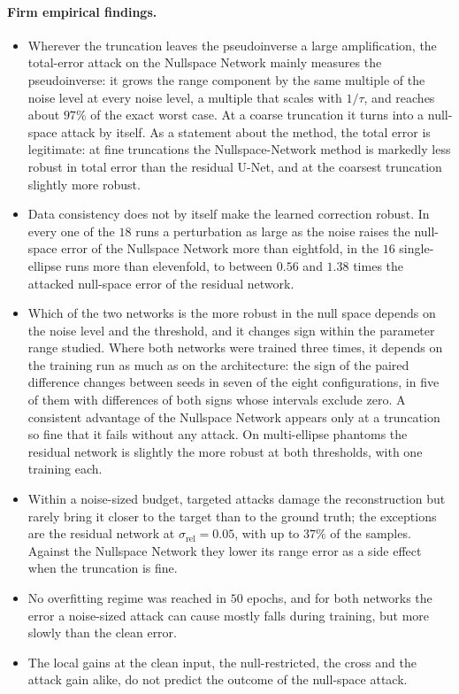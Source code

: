 \documentclass{article}
\numberwithin{equation}{section}
\begin{document}
\paragraph{Firm empirical findings.}
\begin{itemize}
\item Wherever the truncation leaves the pseudoinverse a large amplification, the total-error attack on
the Nullspace Network mainly measures the pseudoinverse: it grows the range component by the same multiple
of the noise level at every noise level, a multiple that scales with $1/\tau$, and reaches about $97\%$ of
the exact worst case. At a coarse truncation it turns into a null-space attack by itself. As a statement
about the method, the total error is legitimate: at fine truncations the Nullspace-Network method is
markedly less robust in total error than the residual U-Net, and at the coarsest truncation slightly more
robust.
\item Data consistency does not by itself make the learned correction robust. In every one of the $18$
runs a perturbation as large as the noise raises the null-space error of the Nullspace Network more than
eightfold, in the $16$ single-ellipse runs more than elevenfold, to between $0.56$ and $1.38$ times the
attacked null-space error of the residual network.
\item Which of the two networks is the more robust in the null space depends on the noise level and the
threshold, and it changes sign within the parameter range studied. Where both networks were trained three
times, it depends on the training run as much as on the architecture: the sign of the paired difference
changes between seeds in seven of the eight configurations, in five of them with differences of both signs
whose intervals exclude zero. A consistent advantage of the Nullspace Network appears only at a truncation
so fine that it fails without any attack. On multi-ellipse phantoms
the residual network is slightly the more robust at both thresholds, with one training each.
\item Within a noise-sized budget, targeted attacks damage the reconstruction but rarely bring it
closer to the target than to the ground truth; the exceptions are the residual network at
$\sigma_\text{rel}=0.05$, with up to $37\%$ of the samples. Against the Nullspace Network they lower its range
error as a side effect when the truncation is fine.
\item No overfitting regime was reached in $50$ epochs, and for both networks the error a noise-sized
attack can cause mostly falls during training, but more slowly than the clean error.
\item The local gains at the clean input, the null-restricted, the cross and the attack gain alike, do not
predict the outcome of the null-space attack.
\end{itemize}
\end{document}
